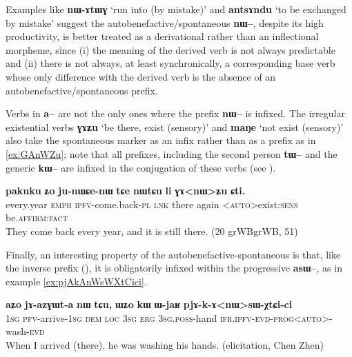 \documentclass[oldfontcommands,oneside,a4paper,11pt]{article}
\newcommand{\ipa}[1]{\textbf{{\phon\mbox{#1}}}} %
\begin{document}
Examples like \ipa{nɯ-ɤtɯɣ}  `run into (by mistake)' and \ipa{antsɤndu} `to be exchanged by mistake'   suggest the autobenefactive/spontaneous \ipa{nɯ--}, despite its high productivity, is better treated as a derivational rather than an inflectional morpheme, since (i) the meaning of the derived verb is not always predictable and (ii) there is not always, at least synchronically, a corresponding base verb whose only difference with the derived verb is the absence of an autobenefactive/spontaneous prefix.
 
Verbs in \ipa{a--} are not the only ones where the prefix \ipa{nɯ--} is infixed. The irregular existential verbs \ipa{ɣɤʑu} `be there, exist (sensory)'  and \ipa{maŋe} `not exist (sensory)' also take  the spontaneous marker as an infix rather than as a prefix as in \ref{ex:GAnWZu}; note that all prefixes, including the second person \ipa{tɯ--} and the generic \ipa{kɯ--} are infixed in the conjugation of these verbs (see \citealt{jacques12agreement, jacques15generic}).
\begin{exe}
\ex \label{ex:GAnWZu}
\gll 
 \ipa{pakuku}  	\ipa{ʑo}  	\ipa{ju-nɯɕe-nɯ}  	\ipa{tɕe}  	\ipa{nɯtɕu}  	\ipa{li}  	\ipa{ɣɤ<nɯ>ʑu}  	\ipa{ɕti.}  	\\
 every.year \textsc{emph} \textsc{ipfv}-come.back-\textsc{pl} \textsc{lnk} there again <\textsc{auto}>exist:\textsc{sens} be.\textsc{affirm:fact} \\
 \glt They come back every year, and it is still there. (20 grWBgrWB, 51)
\end{exe}

Finally, an interesting property of the autobenefactive-spontaneous is that, like the inverse prefix (\citealt[199]{jacques13harmonization}), it is obligatorily infixed within the progressive \ipa{asɯ--}, as in example \ref{ex:pjAkAnWsWXtCici}. 

\begin{exe}
\ex  \label{ex:pjAkAnWsWXtCici}
\gll
\ipa{aʑo}  	\ipa{jɤ-azɣɯt-a}  	\ipa{nɯ} \ipa{tɕu,}  	\ipa{ɯʑo}  	\ipa{kɯ}  	\ipa{ɯ-jaʁ}  	\ipa{pjɤ-k-ɤ<nɯ>sɯ-χtɕi-ci}  \\
 \textsc{1sg} \textsc{pfv}-arrive-\textsc{1sg} \textsc{dem} \textsc{loc} \textsc{3sg} \textsc{erg} \textsc{3sg.poss}-hand \textsc{ifr.ipfv-evd-prog<auto>}-wash-\textsc{evd} \\
\glt When I arrived (there), he was washing his hands. (elicitation, Chen Zhen)
\end{exe}
\end{document}
